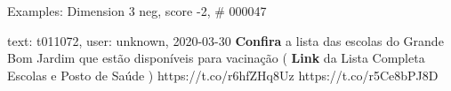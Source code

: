 \begin{frame}{Examples: Dimension 3 neg, score -2, \# 000047}
\footnotesize
\begin{alertblock}{text: t011072, user: unknown, 2020-03-30}
\textbf{Confira} a lista das escolas do Grande Bom Jardim que estão disponíveis 
para vacinação ( \textbf{Link} da Lista Completa Escolas e Posto de Saúde 
  
 ) https://t.co/r6hfZHq8Uz 
https://t.co/r5Ce8bPJ8D 
\end{alertblock}
\end{frame}
